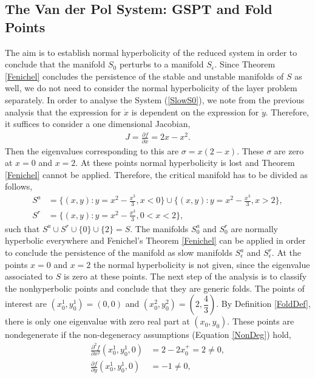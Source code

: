 \subsection{The Van der Pol System: GSPT and Fold Points}\label{VDPfolds}
The aim is to establish normal hyperbolicity of the reduced system in order to conclude that the manifold $S_0$ perturbs to a manifold $S_\epsilon$. Since Theorem \ref{Fenichel} concludes the persistence of the stable and unstable manifolds of $S$ as well, we do not need to consider the normal hyperbolicity of the layer problem separately. In order to analyse the System (\ref{SlowS0}), we note from the previous analysis that the expression for $\dot{x}$ is dependent on the expression for $\dot{y}$. Therefore, it suffices to consider a one dimensional Jacobian,
\begin{align*}
J= \frac{\partial f}{\partial x} = 2x - x^2.
\end{align*}
Then the eigenvalues corresponding to this are $\sigma = x(2-x)$. These $\sigma$ are zero at $x=0$ and $x=2$. At these points normal hyperbolicity is lost and Theorem \ref{Fenichel} cannot be applied. Therefore, the critical manifold has to be divided as follows,
\begin{align*}
S^a &=\bigg \lbrace (x,y): y = x^2-\frac{x^3}{3}, x< 0 \bigg \rbrace \cup \bigg \lbrace (x,y): y = x^2-\frac{x^3}{3}, x>2 \bigg\rbrace, \\
S^r &= \bigg\lbrace (x,y): y = x^2-\frac{x^3}{3}, 0< x< 2 \bigg\rbrace,
\end{align*}
such that $S^a \cup S^r \cup \{0\} \cup \{2\} = S$.
The manifolds $S^a_0$ and $S^r_0$ are normally hyperbolic everywhere and  Fenichel's Theorem \ref{Fenichel} can be applied in order to conclude the persistence of the manifold as slow manifolds $S^a_\epsilon$ and $S^r_\epsilon$. At the points $x=0$ and $x=2$ the normal hyperbolicity is not given, since the eigenvalue associated to $S$ is zero at these points. The next step of the analysis is to classify the nonhyperbolic points and conclude that they are generic folds. The points of interest are $(x_0^1,y_0^1)=(0,0)$ and $(x_0^2,y_0^2)=\left(2,\dfrac{4}{3}\right)$. By Definition \ref{FoldDef}, there is only one eigenvalue with zero real part at $(x_0,y_0)$. These points are nondegenerate if the non-degeneracy assumptions (Equation \ref{NonDeg}) hold,
\begin{align*}
\frac{ \partial ^2 f}{ \partial x^2} (x_0^1,y_0^1, 0) &= 2-2 x_0^+ = 2 \neq 0, \\
\frac{\partial f}{\partial y}(x_0^1,y_0^1, 0) &= -1 \neq 0,

\end{align*}
